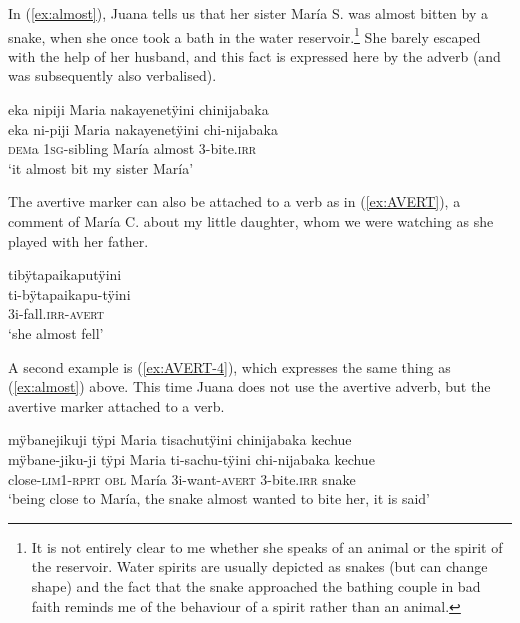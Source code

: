 In (\ref{ex:almost}), Juana tells us that her sister María S. was almost bitten by a snake, when she once took a bath in the water reservoir.\footnote{It is not entirely clear to me whether she speaks of an animal or the spirit of the reservoir. Water spirits are usually depicted as snakes (but can change shape) and the fact that the snake approached the bathing couple in bad faith reminds me of the behaviour of a spirit rather than an animal.}  She barely escaped with the help of her husband, and this fact is expressed here by the adverb (and was subsequently also verbalised). 


\ea\label{ex:almost}
\begingl 
\glpreamble eka nipiji Maria nakayenetÿini chinijabaka\\
\gla eka ni-piji Maria nakayenetÿini chi-nijabaka\\ 
\glb \textsc{dem}a 1\textsc{sg}-sibling María almost 3-bite.\textsc{irr}\\ 
\glft ‘it almost bit my sister María’
\trailingcitation{[jxx-p120515l-2.142]}
\xe

The avertive marker can also be attached to a verb as in (\ref{ex:AVERT}), a comment of María C. about my little daughter, whom we were watching as she played with her father. 

\ea\label{ex:AVERT}
\begingl
\glpreamble tibÿtapaikaputÿini\\
\gla ti-bÿtapaikapu-tÿini\\ 
\glb 3i-fall.\textsc{irr}-\textsc{avert}\\ 
\glft ‘she almost fell’
\trailingcitation{[uxx-p110825l.039]}
\xe

A second example is (\ref{ex:AVERT-4}), which expresses the same thing as (\ref{ex:almost}) above. This time Juana does not use the avertive adverb, but the avertive marker attached to a verb.

\ea\label{ex:AVERT-4}
\begingl
\glpreamble mÿbanejikuji tÿpi Maria tisachutÿini chinijabaka kechue\\
\gla mÿbane-jiku-ji tÿpi Maria ti-sachu-tÿini chi-nijabaka kechue\\
\glb close-\textsc{lim}1-\textsc{rprt} \textsc{obl} María 3i-want-\textsc{avert} 3-bite.\textsc{irr} snake\\
\glft ‘being close to María, the snake almost wanted to bite her, it is said’
\endgl
\trailingcitation{[jxx-p120515l-2.161]}
\xe

